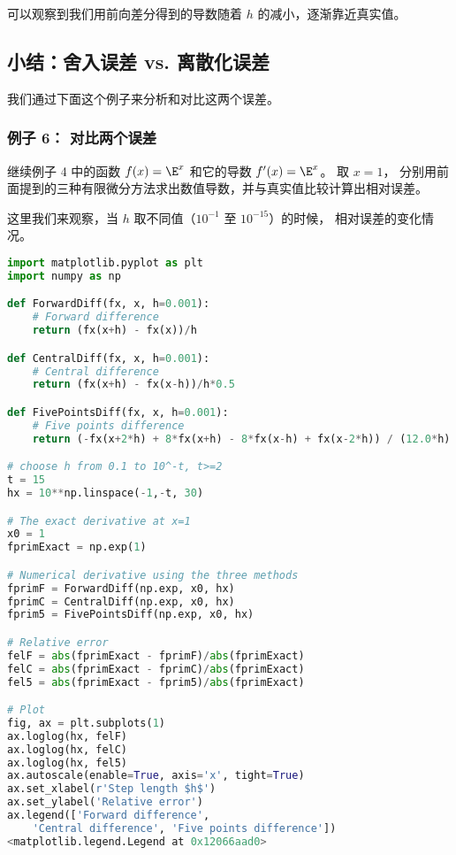 可以观察到我们用前向差分得到的导数随着 $h$ 的减小，逐渐靠近真实值。

\subsection{小结：舍入误差 vs. 离散化误差}

我们通过下面这个例子来分析和对比这两个误差。

\subsubsection{例子 6： 对比两个误差}

继续例子 4 中的函数 $f(x) = \E^x$ 和它的导数 $f'(x) = \E^x$。 取 $x=1$， 分别用前面提到的三种有限微分方法求出数值导数，并与真实值比较计算出相对误差。

这里我们来观察，当 $h$ 取不同值（$10^{-1}$ 至 $10^{-15}$）的时候， 相对误差的变化情况。

\begin{lstlisting}[language=python]
import matplotlib.pyplot as plt
import numpy as np

def ForwardDiff(fx, x, h=0.001):
    # Forward difference
    return (fx(x+h) - fx(x))/h

def CentralDiff(fx, x, h=0.001):
    # Central difference
    return (fx(x+h) - fx(x-h))/h*0.5

def FivePointsDiff(fx, x, h=0.001):
    # Five points difference 
    return (-fx(x+2*h) + 8*fx(x+h) - 8*fx(x-h) + fx(x-2*h)) / (12.0*h)

# choose h from 0.1 to 10^-t, t>=2
t = 15
hx = 10**np.linspace(-1,-t, 30)

# The exact derivative at x=1
x0 = 1
fprimExact = np.exp(1)

# Numerical derivative using the three methods
fprimF = ForwardDiff(np.exp, x0, hx)
fprimC = CentralDiff(np.exp, x0, hx)
fprim5 = FivePointsDiff(np.exp, x0, hx)

# Relative error
felF = abs(fprimExact - fprimF)/abs(fprimExact)
felC = abs(fprimExact - fprimC)/abs(fprimExact)
fel5 = abs(fprimExact - fprim5)/abs(fprimExact)

# Plot
fig, ax = plt.subplots(1)
ax.loglog(hx, felF)
ax.loglog(hx, felC)
ax.loglog(hx, fel5)
ax.autoscale(enable=True, axis='x', tight=True)
ax.set_xlabel(r'Step length $h$')
ax.set_ylabel('Relative error')
ax.legend(['Forward difference',
    'Central difference', 'Five points difference'])
<matplotlib.legend.Legend at 0x12066aad0>
\end{lstlisting}

